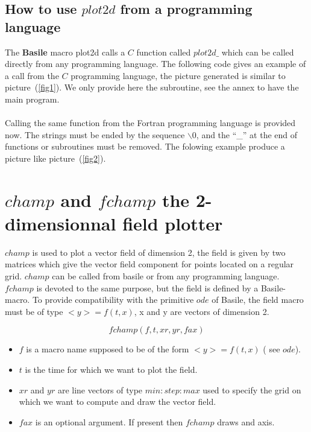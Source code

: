 \subsection{How to use $plot2d$ from a programming language}

The {\bf Basile} macro plot2d calls a $C$ function called $plot2d\_$ which 
 can be called directly from any programming language. The following code 
 gives an example of a call from the $C$ programming language, the picture generated is similar to picture~(\ref{fig1}). We only provide here the subroutine, 
 see the annex to have the main program.



\paragraph{}Calling the same function from the Fortran programming language 
	is provided now. The strings must be ended by the sequence $\backslash0$, and the ``\_'' at the end of functions or subroutines must be removed. 
 The folowing example produce a picture like picture~(\ref{fig2}).

 

\section{$champ$ and $fchamp$ the 2-dimensionnal field plotter}

$champ$ is used to plot a vector field of dimension 2, the field is given 
 by two matrices which give the vector field component for points located on a regular grid. $champ$ can be called from  basile or from any programming language. $fchamp$ is devoted to the same purpose, but the field is defined 
 by a Basile-macro. To provide compatibility with the primitive $ode$ of 
 Basile, the field macro must be of type $<y>=f(t,x)$, x and y are vectors
 of dimension 2.

\[
	fchamp(f,t,xr,yr,fax)
\]
\begin{itemize}
\item $f$ is a macro name supposed to be of the form $<y>=f(t,x)$ ( see $ode$).
\item $t$ is the time for which we want to plot the field.
\item $xr$ and $yr$ are line vectors of type $min:step:max$  used to specify the grid on which we 
 want to compute and draw the vector field.
\item $fax$ is an optional argument. If present then $fchamp$ draws and axis.
\end{itemize}

